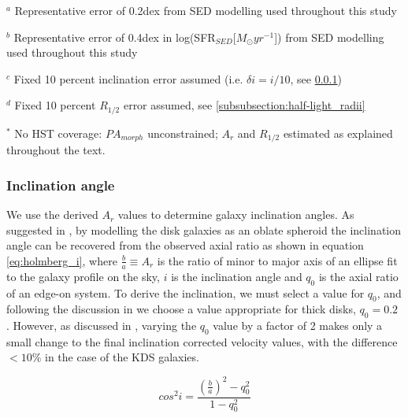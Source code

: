 \documentclass[fleqn,usenatbib]{mn2e}
\begin{document}
\begin{table*}
\begin{threeparttable}
\begin{tabular}{ccccccccccc}
\end{tabular}
\begin{tablenotes}
      \small
      \item $^{a}$ Representative error of 0.2dex from SED modelling used throughout this study
      \item $^{b}$ Representative error of 0.4dex in log(SFR$_{SED}$[$M_{\odot}yr^{-1}$]) from SED modelling used throughout this study
      \item $^{c}$ Fixed 10 percent inclination error assumed (i.e. $\delta i = i / 10$, see \protect\cref{subsubsection:inclination_angle})
      \item $^{d}$ Fixed 10 percent $R_{1/2}$ error assumed, see \protect\cref{subsubsection:half-light_radii}
      \item $^{*}$ No HST coverage: $PA_{morph}$ unconstrained; $A_{r}$ and $R_{1/2}$ estimated as explained throughout the text.
    \end{tablenotes}
  \end{threeparttable}
  \end{table*}


\subsubsection{Inclination angle}\label{subsubsection:inclination_angle}
We use the derived $A_{r}$ values to determine galaxy inclination angles.
As suggested in \cite{Holmberg1958}, by modelling the disk galaxies as an oblate spheroid the inclination angle can be recovered from the observed axial ratio as shown in equation \ref{eq:holmberg_i}, where $\frac{b}{a} \equiv A_{r}$ is the ratio of minor to major axis of an ellipse fit to the galaxy profile on the sky, $i$ is the inclination angle and $q_{0}$ is the axial ratio of an edge-on system.
To derive the inclination, we must select a value for $q_{0}$, and following the discussion in \citep{Law2012a} we choose a value appropriate for thick disks, $q_{0} = 0.2$ \citep[e.g.][]{Epinat2012,Harrison2017}.
However, as discussed in \cite{Harrison2017}, varying the $q_{0}$ value by a factor of 2 makes only a small change to the final inclination corrected velocity values, with the difference $<10\%$ in the case of the KDS galaxies.

\begin{equation}\label{eq:holmberg_i}
   cos^{2}i = \frac{\left(\frac{b}{a}\right)^{2} - q_{0}^{2}}{1 - q_{0}^{2}}
\end{equation}
\end{document}

